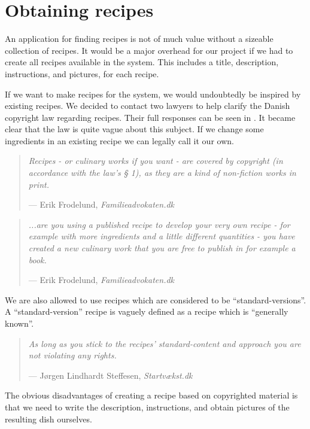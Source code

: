 \section{Obtaining recipes}
An application for finding recipes is not of much value without a sizeable collection of recipes. It would be a major overhead for our project if we had to create all recipes available in the system. This includes a title, description, instructions, and pictures, for each recipe.

If we want to make recipes for the system, we would undoubtedly be inspired by existing recipes. We decided to contact two lawyers to help clarify the Danish copyright law regarding recipes. Their full responses can be seen in . It became clear that the law is quite vague about this subject. If we change some ingredients in an existing recipe we can legally call it our own.
\begin{quote}
\textit{Recipes - or culinary works if you want - are covered by copyright (in accordance with the law's § 1), as they are a kind of non-fiction works in print.}\par\raggedleft--- \textup{Erik Frodelund}, \textit{Familieadvokaten.dk}
\end{quote}
\begin{quote}

\textit{...are you using a published recipe to develop your very own recipe - for example with more ingredients and a little different quantities - you have created a new culinary work that you are free to publish in for example a book.}\par\raggedleft--- \textup{Erik Frodelund}, \textit{Familieadvokaten.dk}
\end{quote}
We are also allowed to use recipes which are considered to be ``standard-versions''. A ``standard-version'' recipe is vaguely defined as a recipe which is ``generally known''.
\begin{quote}
\textit{As long as you stick to the recipes' standard-content and approach you are not violating any rights.}\par\raggedleft--- \textup{Jørgen Lindhardt Steffesen}, \textit{Startvækst.dk}
\end{quote}
The obvious disadvantages of creating a recipe based on copyrighted material is that we need to write the description, instructions, and obtain pictures of the resulting dish ourselves.

